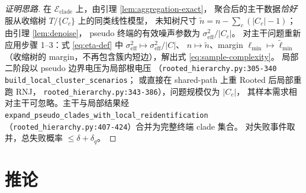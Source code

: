 \documentclass[UTF8,11pt]{ctexart}
\begin{document}
\begin{proof}[证明思路]
在 $\mathcal{E}_{\mathrm{clade}}$ 上，由引理 \ref{lem:aggregation-exact}，
聚合后的主干数据\emph{恰好}服从收缩树 $T/\{C_c\}$ 上的同类线性模型，
未知树尺寸 $\tilde n=n-\sum_c(|C_c|-1)$；由引理 \ref{lem:denoise}，
pseudo 终端的有效噪声参数为 $\sigma_{\mathrm{eff}}^2/|C_c|$。
对主干问题重新应用步骤 1--3：式 \eqref{eq:eta-def} 中
$\sigma_{\mathrm{eff}}^2\mapsto\sigma_{\mathrm{eff}}^2/|C|$、
$n\mapsto\tilde n$、margin $\ell_{\min}\mapsto\widetilde\ell_{\min}$
（收缩树的 margin，不再包含簇内短边），解出式 \eqref{eq:sample-complexity}。
局部二阶段以 pseudo 边界电压为局部根电压
（\texttt{rooted\_hierarchy.py:305-340} \texttt{build\_local\_cluster\_scenarios}；
或直接在 shared-path 上重 Rooted 后局部重跑 RNJ，
\texttt{rooted\_hierarchy.py:343-386}），问题规模仅为 $|C_c|$，
其样本需求相对主干可忽略。主干与局部结果经
\texttt{expand\_pseudo\_clades\_with\_local\_reidentification}
（\texttt{rooted\_hierarchy.py:407-424}）合并为完整终端 clade 集合。
对失败事件取并，总失败概率 $\le\delta+\delta_q$。
\end{proof}

\section{推论}
\label{sec:corollaries}
\end{document}
